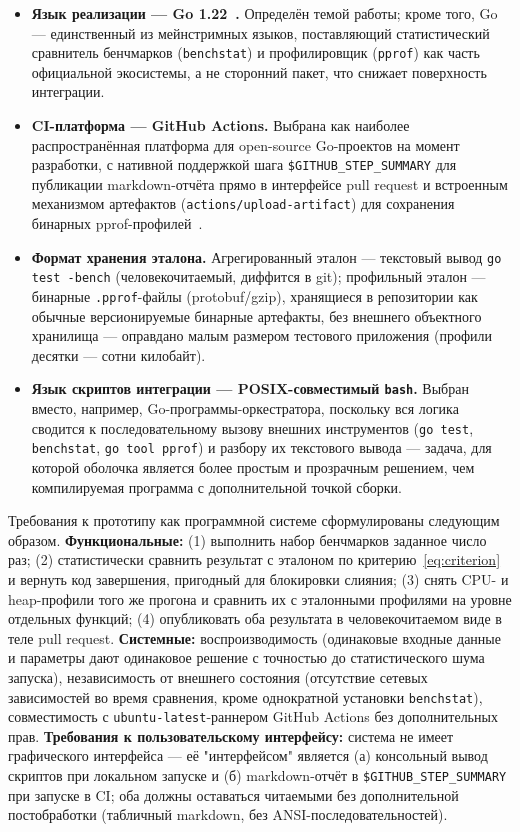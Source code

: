 \documentclass[12pt,a4paper]{article}
\numberwithin{equation}{section}
\begin{document}
\begin{itemize}
\item \textbf{Язык реализации — Go 1.22~\cite{go-release-notes}.} Определён
темой работы; кроме того, Go — единственный из мейнстримных языков, поставляющий
статистический сравнитель бенчмарков (\texttt{benchstat}) и профилировщик
(\texttt{pprof}) как часть официальной экосистемы, а не сторонний пакет,
что снижает поверхность интеграции.
\item \textbf{CI-платформа — GitHub Actions.} Выбрана как наиболее
распространённая платформа для open-source Go-проектов на момент
разработки, с нативной поддержкой шага \texttt{\$GITHUB\_STEP\_SUMMARY} для
публикации markdown-отчёта прямо в интерфейсе pull request и встроенным
механизмом артефактов (\texttt{actions/\allowbreak upload-artifact}) для сохранения
бинарных pprof-профилей~\cite{gh-actions-doc}.
\item \textbf{Формат хранения эталона.} Агрегированный эталон —
текстовый вывод \texttt{go test -bench} (человекочитаемый, диффится в git);
профильный эталон — бинарные \texttt{.pprof}-файлы (protobuf/gzip),
хранящиеся в репозитории как обычные версионируемые бинарные артефакты, без
внешнего объектного хранилища — оправдано малым размером тестового
приложения (профили десятки — сотни килобайт).
\item \textbf{Язык скриптов интеграции — POSIX-совместимый \texttt{bash}.}
Выбран вместо, например, Go-программы-оркестратора, поскольку вся логика
сводится к последовательному вызову внешних инструментов (\texttt{go
test}, \texttt{benchstat}, \texttt{go tool pprof}) и разбору их текстового
вывода — задача, для которой оболочка является более простым и прозрачным
решением, чем компилируемая программа с дополнительной точкой сборки.
\end{itemize}

Требования к прототипу как программной системе сформулированы следующим
образом. \textbf{Функциональные:} (1) выполнить набор бенчмарков заданное
число раз; (2) статистически сравнить результат с эталоном по
критерию~\eqref{eq:criterion} и вернуть код завершения, пригодный для
блокировки слияния; (3) снять CPU- и heap-профили того же прогона и
сравнить их с эталонными профилями на уровне отдельных функций;
(4) опубликовать оба результата в человекочитаемом виде в теле pull
request. \textbf{Системные:} воспроизводимость (одинаковые входные данные
и параметры дают одинаковое решение с точностью до статистического шума
запуска), независимость от внешнего состояния (отсутствие сетевых
зависимостей во время сравнения, кроме однократной установки
\texttt{benchstat}), совместимость с \texttt{ubuntu-latest}-раннером
GitHub Actions без дополнительных прав. \textbf{Требования к
пользовательскому интерфейсу:} система не имеет графического интерфейса —
её "интерфейсом" является (а) консольный вывод скриптов при локальном
запуске и (б) markdown-отчёт в \texttt{\$GITHUB\_STEP\_SUMMARY} при запуске
в CI; оба должны оставаться читаемыми без дополнительной постобработки
(табличный markdown, без ANSI-последовательностей).
\end{document}
